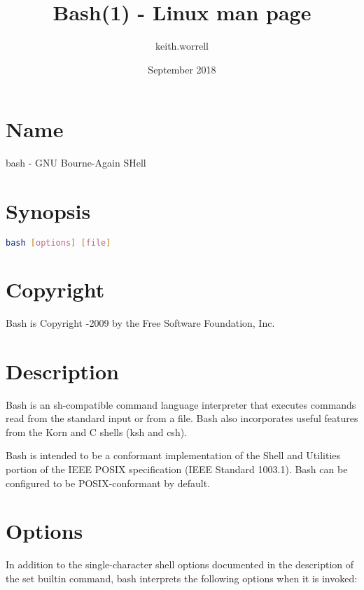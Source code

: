 \documentclass[11pt]{article}
\title{Bash(1) - Linux man page}
\author{keith.worrell}
\date{September 2018}
\begin{document}
\maketitle

\section{Name}
bash - GNU Bourne-Again SHell

\section{Synopsis}
\label{sec:synopsis}
\noindent
\begin{lstlisting}[language=bash]
  bash [options] [file]
\end{lstlisting}

\section{Copyright}
Bash is Copyright -2009 by the Free Software Foundation, Inc.

\section{Description}
\label{sec:description}
 
Bash is an sh-compatible command language interpreter that executes commands read from the standard input or from a file. Bash also incorporates useful features from the Korn and C shells (ksh and csh).

Bash is intended to be a conformant implementation of the Shell and Utilities portion of the IEEE POSIX specification (IEEE Standard 1003.1). Bash can be configured to be POSIX-conformant by default.

\section{Options}
\label{sec:options}
In addition to the single-character shell options documented in the description of the set builtin command, bash interprets the following options when it is invoked:

\renewcommand{\arraystretch}{2}
\end{document}
